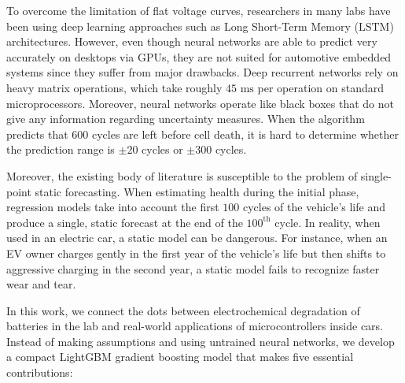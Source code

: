 \documentclass[pdflatex,sn-mathphys-num]{sn-jnl}%
\theoremstyle{thmstyleone}%
\theoremstyle{thmstyletwo}%
\theoremstyle{thmstylethree}%
\begin{document}
To overcome the limitation of flat voltage curves, researchers in many labs have been using deep learning approaches such as Long Short-Term Memory ($\text{LSTM}$) architectures. However, even though neural networks are able to predict very accurately on desktops via GPUs, they are not suited for automotive embedded systems since they suffer from major drawbacks. Deep recurrent networks rely on heavy matrix operations, which take roughly $45\text{ ms}$ per operation on standard microprocessors. Moreover, neural networks operate like black boxes that do not give any information regarding uncertainty measures. When the algorithm predicts that $600$ cycles are left before cell death, it is hard to determine whether the prediction range is $\pm 20$ cycles or $\pm 300$ cycles.

Moreover, the existing body of literature is susceptible to the problem of single-point static forecasting. When estimating health during the initial phase, regression models take into account the first $100$ cycles of the vehicle's life and produce a single, static forecast at the end of the $100^{\text{th}}$ cycle. In reality, when used in an electric car, a static model can be dangerous. For instance, when an EV owner charges gently in the first year of the vehicle's life but then shifts to aggressive charging in the second year, a static model fails to recognize faster wear and tear.

In this work, we connect the dots between electrochemical degradation of batteries in the lab and real-world applications of microcontrollers inside cars. Instead of making assumptions and using untrained neural networks, we develop a compact LightGBM gradient boosting model that makes five essential contributions:
\end{document}

